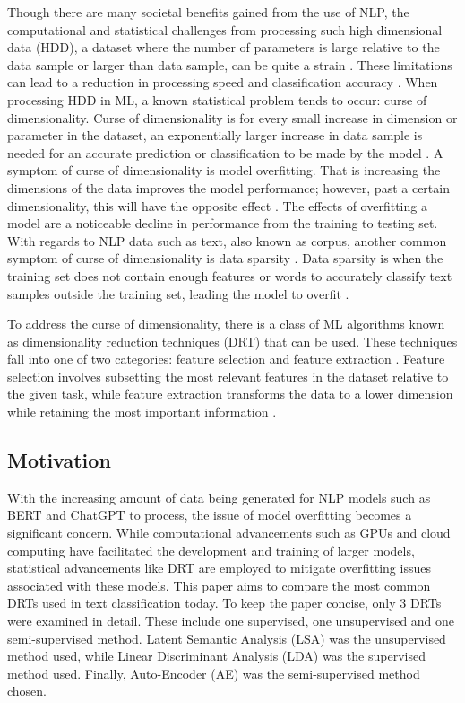 \documentclass[12pt]{article}
\begin{document}
Though there are many societal benefits gained from the use of NLP, the computational and statistical challenges from processing such high dimensional data (HDD), a dataset where the number of parameters is large relative to the data sample or larger than data sample, can be quite a strain \parencite{buehlmann_peter_van_de_geer_2013}. These limitations can lead to a reduction in processing speed and classification accuracy \parencite{ayesha_hanif_talib_2020}. When processing HDD in ML, a known statistical problem tends to occur: curse of dimensionality. Curse of dimensionality is for every small increase in dimension or parameter in the dataset, an exponentially larger increase in data sample is needed for an accurate prediction or classification to be made by the model \parencite{ayesha_hanif_talib_2020}. A symptom of curse of dimensionality is model overfitting. That is increasing the dimensions of the data improves the model performance; however, past a certain dimensionality, this will have the opposite effect \parencite{ayesha_hanif_talib_2020}. The effects of overfitting a model are a noticeable decline in performance from the training to testing set. With regards to NLP data such as text, also known as corpus, another common symptom of curse of dimensionality is data sparsity \parencite{another_look}. Data sparsity is when the training set does not contain enough features or words to accurately classify text samples outside the training set, leading the model to overfit \parencite{another_look}.

To address the curse of dimensionality, there is a class of ML algorithms known as dimensionality reduction techniques (DRT) that can be used. These techniques fall into one of two categories: feature selection and feature extraction \parencite{ayesha_hanif_talib_2020}. Feature selection involves subsetting the most relevant features in the dataset relative to the given task, while feature extraction transforms the data to a lower dimension while retaining the most important information \parencite{ayesha_hanif_talib_2020}.

\subsection{Motivation}
\hspace{\parindent} With the increasing amount of data being generated for NLP models such as BERT and ChatGPT to process, the issue of model overfitting becomes a significant concern. While computational advancements such as GPUs and cloud computing have facilitated the development and training of larger models, statistical advancements like DRT are employed to mitigate overfitting issues associated with these models. This paper aims to compare the most common DRTs used in text classification today. To keep the paper concise, only 3 DRTs were examined in detail. These include one supervised, one unsupervised and one semi-supervised method. Latent Semantic Analysis (LSA) was the unsupervised method used, while Linear Discriminant Analysis (LDA) was the supervised method used. Finally, Auto-Encoder (AE) was the semi-supervised method chosen.
\end{document}
